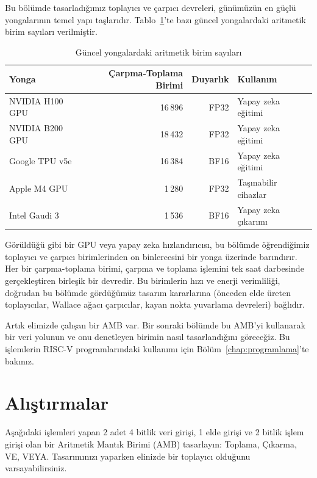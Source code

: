 Bu bölümde tasarladığımız toplayıcı ve çarpıcı devreleri, günümüzün en güçlü yongalarının temel yapı taşlarıdır. Tablo~\ref{tab:yonga-aritmetik}'te bazı güncel yongalardaki aritmetik birim sayıları verilmiştir.

\begin{table}[htbp]
\centering
\caption{Güncel yongalardaki aritmetik birim sayıları}
\label{tab:yonga-aritmetik}
\begin{tabular}{l r r l}
\toprule
\textbf{Yonga} & \textbf{Çarpma-Toplama Birimi} & \textbf{Duyarlık} & \textbf{Kullanım} \\
\midrule
NVIDIA H100 GPU     & 16\,896 & FP32 & Yapay zeka eğitimi \\
NVIDIA B200 GPU     & 18\,432 & FP32 & Yapay zeka eğitimi \\
Google TPU v5e      & 16\,384 & BF16 & Yapay zeka eğitimi \\
Apple M4 GPU        & 1\,280  & FP32 & Taşınabilir cihazlar \\
Intel Gaudi 3       & 1\,536  & BF16 & Yapay zeka çıkarımı \\
\bottomrule
\end{tabular}
\end{table}

Görüldüğü gibi bir GPU veya yapay zeka hızlandırıcısı, bu bölümde öğrendiğimiz toplayıcı ve çarpıcı birimlerinden on binlercesini bir yonga üzerinde barındırır. Her bir çarpma-toplama birimi, çarpma ve toplama işlemini tek saat darbesinde gerçekleştiren birleşik bir devredir. Bu birimlerin hızı ve enerji verimliliği, doğrudan bu bölümde gördüğümüz tasarım kararlarına (önceden elde üreten toplayıcılar, Wallace ağacı çarpıcılar, kayan nokta yuvarlama devreleri) bağlıdır.

Artık elimizde çalışan bir AMB var. Bir sonraki bölümde bu AMB'yi kullanarak bir veri yolunun ve onu denetleyen birimin nasıl tasarlandığını göreceğiz. Bu işlemlerin RISC-V programlarındaki kullanımı için Bölüm~\ref{chap:programlama}'te bakınız.


\section*{Alıştırmalar}

\begin{alistirma}[\orta]
Aşağıdaki işlemleri yapan 2 adet 4 bitlik veri girişi, 1 elde girişi ve 2 bitlik işlem girişi olan bir Aritmetik Mantık Birimi (AMB) tasarlayın: Toplama, Çıkarma, VE, VEYA. Tasarımınızı yaparken elinizde bir toplayıcı olduğunu varsayabilirsiniz.
\end{alistirma}


